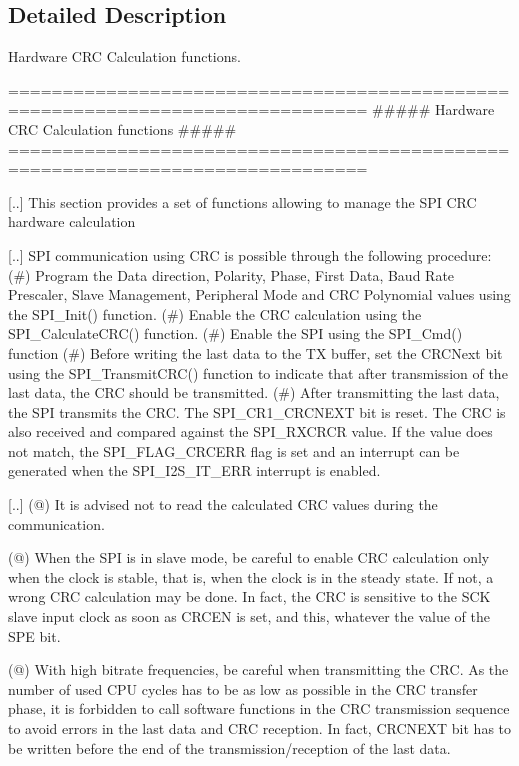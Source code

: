 \subsection{Detailed Description}
Hardware C\+RC Calculation functions. 

\begin{DoxyVerb} ===============================================================================
                 ##### Hardware CRC Calculation functions #####
 ===============================================================================  

 [..] This section provides a set of functions allowing to manage the SPI CRC hardware 
      calculation

 [..] SPI communication using CRC is possible through the following procedure:
   (#) Program the Data direction, Polarity, Phase, First Data, Baud Rate Prescaler, 
       Slave Management, Peripheral Mode and CRC Polynomial values using the SPI_Init()
       function.
   (#) Enable the CRC calculation using the SPI_CalculateCRC() function.
   (#) Enable the SPI using the SPI_Cmd() function
   (#) Before writing the last data to the TX buffer, set the CRCNext bit using the 
       SPI_TransmitCRC() function to indicate that after transmission of the last 
       data, the CRC should be transmitted.
   (#) After transmitting the last data, the SPI transmits the CRC. The SPI_CR1_CRCNEXT
        bit is reset. The CRC is also received and compared against the SPI_RXCRCR 
        value. 
        If the value does not match, the SPI_FLAG_CRCERR flag is set and an interrupt
        can be generated when the SPI_I2S_IT_ERR interrupt is enabled.

 [..]
   (@) It is advised not to read the calculated CRC values during the communication.

   (@) When the SPI is in slave mode, be careful to enable CRC calculation only 
       when the clock is stable, that is, when the clock is in the steady state. 
       If not, a wrong CRC calculation may be done. In fact, the CRC is sensitive 
       to the SCK slave input clock as soon as CRCEN is set, and this, whatever 
       the value of the SPE bit.

   (@) With high bitrate frequencies, be careful when transmitting the CRC.
       As the number of used CPU cycles has to be as low as possible in the CRC 
       transfer phase, it is forbidden to call software functions in the CRC 
       transmission sequence to avoid errors in the last data and CRC reception. 
       In fact, CRCNEXT bit has to be written before the end of the transmission/reception 
       of the last data.


\end{DoxyVerb}
